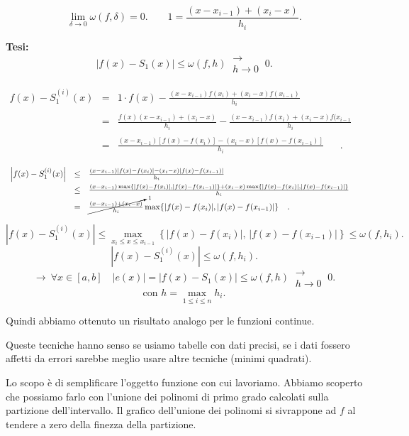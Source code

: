 \begin{osse}
\[\lim_{\delta \to 0}\omega(f, \delta) = 0. \qquad 1 = 
\frac{(x-x_{i-1})+(x_i-x)}{h_i}.\]
\end{osse}

\textbf{Tesi:}
\[
|f(x) - S_1(x)| \leq \omega(f, h)\ \substack{\longrightarrow \\ h \to 0} \ 0.
\]

\[
\begin{array}{lcl}
f(x) - S^{(i)}_1(x) & = & 1 \cdot f(x) - \frac{(x-x_{i-1})f(x_i) + 
(x_i-x)f(x_{i-1})}{h_i}^{\phantom{(1)}} \\
& = & \frac{f(x)(x-x_{i-1}) + (x_i-x)}{h_i} -
\frac{(x-x_{i-1})f(x_i)+(x_i-x)f(x_{i-1}}{h_i}^{\phantom{(1)}} \\
& = & \frac{(x-x_{i-1})[f(x)-f(x_i)]-(x_i-x)[f(x)-f(x_{i-1})]}{h_i}^{\phantom{(1)}}.
\end{array}
\]

\[
\begin{array}{lcl}
\left|f(x) - S^{(i)}_1(x)\right| & \leq & 
\frac{(x-x_{i-1})|f(x)-f(x_i)|-(x_i-x)|f(x)-f(x_{i-1})|}{h_i}^{\phantom{(1)}} \\
& \leq & \frac{(x-x_{i-1})\max\{|f(x)-f(x_i)|,|f(x)-f(x_{i-1})|\}
+(x_i-x) \max\{|f(x)-f(x_i)|,|f(x)-f(x_{i-1})|\}}{h_i}^{\phantom{(1)}} \\
& = &  \cancelto{1}{\frac{(x-x_{i-1})+(x_i-x)}{h_i}}
\max\{|f(x)-f(x_i)|,|f(x)-f(x_{i-1})|\}^{\phantom{(1)}}.
\end{array}
\]

\[
\left|f(x) - S^{(i)}_1(x)\right|  \leq 
\max_{x_i \leq x \leq x_{i-1}}\left\{|f(x)-f(x_i)|,\,|f(x)-
f(x_{i-1})|\right\} \leq \omega(f,h_i).
\]
\[
\left|f(x) - S^{(i)}_1(x)\right|  \leq \omega(f,h_i).
\]
\[
\longrightarrow \ \forall x \in [a,b] \quad |e(x)| =  \left|f(x) - 
S_1(x)\right| \leq \omega(f,h)\ \substack{\longrightarrow \\ h \to 0} \ 0.
\]
\[\textrm{con } h = \max_{1 \leq i \leq n}h_i.\]

Quindi abbiamo ottenuto un risultato analogo per le funzioni continue.

\begin{osse}
Queste tecniche hanno senso se usiamo tabelle con dati precisi, se i dati
fossero affetti da errori sarebbe meglio usare altre tecniche (minimi
quadrati).
\end{osse}

Lo scopo è di semplificare l'oggetto funzione con cui lavoriamo. Abbiamo
scoperto che possiamo farlo con l'unione dei polinomi di primo grado
calcolati sulla partizione dell'intervallo. Il grafico dell'unione dei 
polinomi si sivrappone ad $f$ al tendere a zero della finezza della
partizione.

